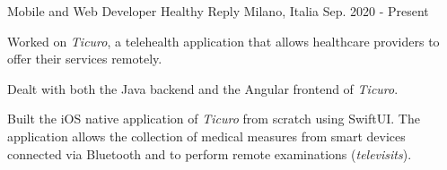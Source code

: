 

\begin{cventries}

  \cventry
    {Mobile and Web Developer} %
    {Healthy Reply} %
    {Milano, Italia} %
    {Sep. 2020 - Present} %
    {
      \begin{cvitems}
        \item Worked on \textit{Ticuro}, a telehealth application that allows healthcare providers to offer their services remotely.
        \item Dealt with both the Java backend and the Angular frontend of \textit{Ticuro}.
        \item Built the iOS native application of \textit{Ticuro} from scratch using SwiftUI. The application allows the collection of medical measures from smart devices connected via Bluetooth and to perform remote examinations (\textit{televisits}).
      \end{cvitems}
    }

\end{cventries}
